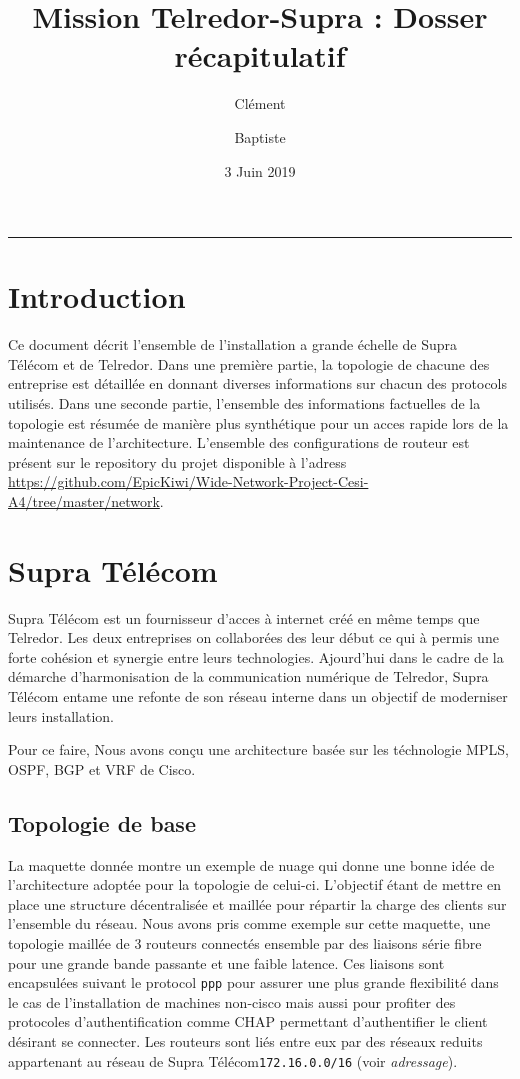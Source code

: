 \documentclass{article}
\title{Mission Telredor-Supra : Dosser récapitulatif}
\date{3 Juin 2019}
\author{Clément \bsc{Boutin} \and Baptiste \bsc{Saclier}}
\newcommand{\tlr}{Telredor\xspace}
\newcommand{\spr}{Supra Télécom\xspace}
\begin{document}
\maketitle

\begin{center}
\rule{0.5\textwidth}{0.4pt}
\end{center}

\tableofcontents

\section{Introduction}

Ce document décrit l'ensemble de l'installation a grande échelle de \spr et de \tlr. 
Dans une première partie, la topologie de chacune des entreprise est détaillée en donnant diverses informations sur chacun des protocols utilisés.
Dans une seconde partie, l'ensemble des informations factuelles de la topologie est résumée de manière plus synthétique pour un acces rapide lors de la maintenance de l'architecture.
L'ensemble des configurations de routeur est présent sur le repository du projet disponible à l'adress \url{https://github.com/EpicKiwi/Wide-Network-Project-Cesi-A4/tree/master/network}.

\section{\spr}

\spr est un fournisseur d'acces à internet créé en même temps que \tlr.
Les deux entreprises on collaborées des leur début ce qui à permis une forte cohésion et synergie entre leurs technologies.
Ajourd'hui dans le cadre de la démarche d'harmonisation de la communication numérique de \tlr, \spr entame une refonte de son réseau interne dans un objectif de moderniser leurs installation.

Pour ce faire, Nous avons conçu une architecture basée sur les téchnologie MPLS, OSPF, BGP et VRF de Cisco.

\subsection{Topologie de base}

La maquette donnée montre un exemple de nuage qui donne une bonne idée de l'architecture adoptée pour la topologie de celui-ci.
L'objectif étant de mettre en place une structure décentralisée et maillée pour répartir la charge des clients sur l'ensemble du réseau.
Nous avons pris comme exemple sur cette maquette, une topologie maillée de 3 routeurs connectés ensemble par des liaisons série fibre pour une grande bande passante et une faible latence.
Ces liaisons sont encapsulées suivant le protocol \texttt{ppp} pour assurer une plus grande flexibilité dans le cas de l'installation de machines non-cisco mais aussi pour profiter des protocoles d'authentification comme CHAP permettant d'authentifier le client désirant se connecter.
Les routeurs sont liés entre eux par des réseaux reduits appartenant au réseau de \spr \texttt{172.16.0.0/16} (voir \emph{adressage}).
\end{document}
